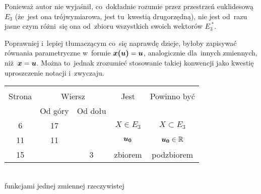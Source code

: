\documentclass[a4paper,11pt]{article}
\begin{document}
\start {} Ponieważ autor nie wyjaśnił, co~dokładnie rozumie przez
przestrzeń euklidesową $E_{ 3 }$ (że~jest ona trójwymiarowa, jest
tu~kwestią drugorzędną), nie jest od~razu jasne czym różni~się ona
od~zbioru wszystkich swoich wektorów $E_{ 3 }^{ \;* }$.

\vspace{\spaceFour}


\start {}

\vspace{\spaceFour}


\start {} Poprawniej i~lepiej tłumaczącym co~się naprawdę dzieje,
byłoby zapisywać równania parametryczne w~formie
$\boldsymbol{x( u )} = \boldsymbol{u}$, analogicznie dla~innych zmiennych,
niż~$\boldsymbol{x} = \boldsymbol{u}$. Można to~jednak zrozumieć stosowanie takiej
konwencji jako kwestię uproszczenie notacji i~zwyczaju.

\vspace{\spaceFour}


\begin{center}
  \begin{tabular}{|c|c|c|c|c|}
    \hline
    & \multicolumn{2}{c|}{} & & \\
    Strona & \multicolumn{2}{c|}{Wiersz} & Jest
                              & Powinno być \\ \cline{2-3}
    & Od góry & Od dołu & & \\
    \hline
    6   & 17 & & $X \in E_{ 3 }$ & $X \subset E_{ 3 }$ \\
    11  & 11 & & $\boldsymbol{u_{ 0 }}$ & $\boldsymbol{u_{ 0 }} \in \mathbb{R}$ \\
    15  & &  3 & zbiorem & podzbiorem \\
    \hline
  \end{tabular}
\end{center}
\noi
{} \\
\Jest funkcjami jednej zmiennej rzeczywistej \\
\Pow {} \\

\vspace{\spaceTwo}
\end{document}
